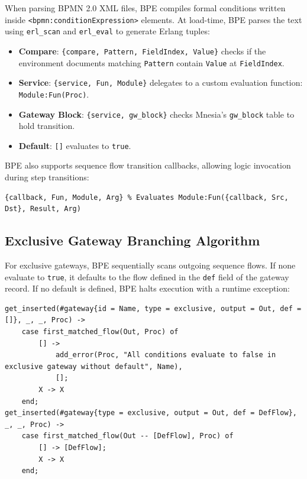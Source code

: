 \documentclass[11pt,a4paper]{article}
\begin{document}
When parsing BPMN 2.0 XML files, BPE compiles formal conditions written inside \texttt{<bpmn:conditionExpression>} elements. At load-time, BPE parses the text using \texttt{erl\_scan} and \texttt{erl\_eval} to generate Erlang tuples:
\begin{itemize}
    \item \textbf{Compare}: \texttt{\{compare, Pattern, FieldIndex, Value\}} checks if the environment documents matching \texttt{Pattern} contain \texttt{Value} at \texttt{FieldIndex}.
    \item \textbf{Service}: \texttt{\{service, Fun, Module\}} delegates to a custom evaluation function: \texttt{Module:Fun(Proc)}.
    \item \textbf{Gateway Block}: \texttt{\{service, gw\_block\}} checks Mnesia's \texttt{gw\_block} table to hold transition.
    \item \textbf{Default}: \texttt{[]} evaluates to \texttt{true}.
\end{itemize}

BPE also supports sequence flow transition callbacks, allowing logic invocation during step transitions:
\begin{lstlisting}
{callback, Fun, Module, Arg} % Evaluates Module:Fun({callback, Src, Dst}, Result, Arg)
\end{lstlisting}

\subsection{Exclusive Gateway Branching Algorithm}

For exclusive gateways, BPE sequentially scans outgoing sequence flows. If none evaluate to \texttt{true}, it defaults to the flow defined in the \texttt{def} field of the gateway record. If no default is defined, BPE halts execution with a runtime exception:

\begin{lstlisting}
get_inserted(#gateway{id = Name, type = exclusive, output = Out, def = []}, _, _, Proc) ->
    case first_matched_flow(Out, Proc) of
        [] ->
            add_error(Proc, "All conditions evaluate to false in exclusive gateway without default", Name),
            [];
        X -> X
    end;
get_inserted(#gateway{type = exclusive, output = Out, def = DefFlow}, _, _, Proc) ->
    case first_matched_flow(Out -- [DefFlow], Proc) of
        [] -> [DefFlow];
        X -> X
    end;
\end{lstlisting}
\end{document}
